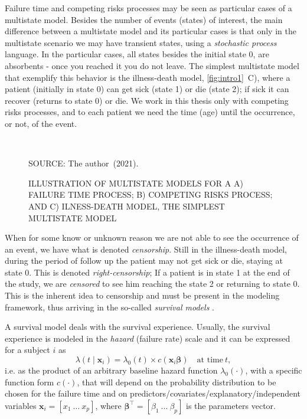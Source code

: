Failure time and competing risks processes may be seen as particular
cases of a multistate model. Besides the number of events (states) of
interest, the main difference between a multistate model and its
particular cases is that only in the multistate scenario we may have
transient states, using a \textit{stochastic process} language. In the
particular cases, all states besides the initial state 0, are absorbents
- once you reached it you do not leave. The simplest multistate model
that exemplify this behavior is the illness-death model,
\autoref{fig:intro1}~C), where a patient (initially in state 0) can get
sick (state 1) or die (state 2); if sick it can recover (returns to
state 0) or die. We work in this thesis only with competing risks
processes, and to each patient we need the time (age) until the
occurrence, or not, of the event.

\begin{figure}[H]
 \setlength{\abovecaptionskip}{.0001pt}
 \caption{ILLUSTRATION OF MULTISTATE MODELS FOR A A) FAILURE TIME
          PROCESS; B) COMPETING RISKS PROCESS; AND C) ILNESS-DEATH
          MODEL, THE SIMPLEST MULTISTATE MODEL}
 \vspace{0.5cm}\centering
 \\
 \vspace{0.5cm}
 \begin{footnotesize}
  SOURCE: The author~(2021).
 \end{footnotesize}
 \label{fig:intro1}
\end{figure}

When for some know or unknown reason we are not able to see the
occurrence of an event, we have what is denoted \textit{censorship}.
Still in the illness-death model, during the period of follow up the
patient may not get sick or die, staying at state 0. This is denoted
\textit{right-censorship}; If a patient is in state 1 at the end of the
study, we are \textit{censored} to see him reaching the state 2 or
returning to state 0. This is the inherent idea to censorship and must
be present in the modeling framework, thus arriving in the so-called
\textit{survival models} \cite{kalb&prentice}.

A survival model deals with the survival experience. Usually, the
survival experience is modeled in the \textit{hazard} (failure rate)
scale and it can be expressed for a subject \(i\) as
\begin{equation}
  \lambda(t \mid \bm{x}_{i}) =
  \lambda_{0}(t) \times c(\bm{x}_{i} \bm{\beta})
  \quad \text{at time}~t,
  \label{eq:intro1}
\end{equation}
i.e. as the product of an arbitrary baseline hazard function
\(\lambda_{0}(\cdot)\), with a specific function form \(c(\cdot)\), that
will depend on the probability distribution to be chosen for the failure
time and on predictors/covariates/explanatory/independent variables
\(\bm{x}_{i} = [x_{1}~\dots~x_{p}]\), where
\(\bm{\beta}^{\top} = [\beta_{1}~\dots~\beta_{p}]\) is the parameters
vector.

